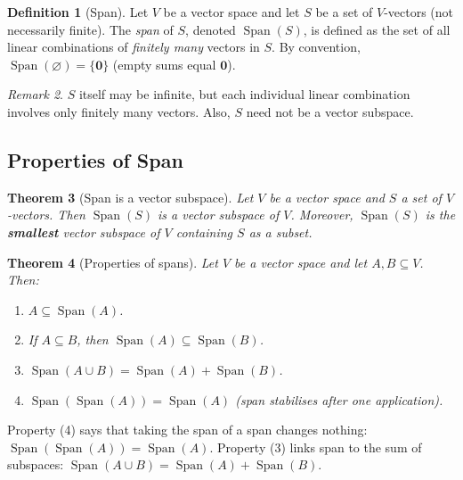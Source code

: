 \documentclass[11pt, a4paper, notitlepage]{report}
\newtheorem{theorem}{Theorem}[section]
\theoremstyle{definition}
\newtheorem{definition}[theorem]{Definition}
\theoremstyle{remark}
\newtheorem{remark}[theorem]{Remark}
\begin{document}
\begin{definition}[Span]\label{def:span}
Let $V$ be a vector space and let $S$ be a set of $V$-vectors (not necessarily finite). The \emph{span} of $S$, denoted $\operatorname{Span}(S)$, is defined as the set of all linear combinations of \emph{finitely many} vectors in $S$. By convention, $\operatorname{Span}(\varnothing) = \{\mathbf{0}\}$ (empty sums equal $\mathbf{0}$).
\end{definition}

\begin{remark}
$S$ itself may be infinite, but each individual linear combination involves only finitely many vectors. Also, $S$ need not be a vector subspace.
\end{remark}

\subsection{Properties of Span}

\begin{theorem}[Span is a vector subspace]\label{thm:span-subspace}
Let $V$ be a vector space and $S$ a set of $V$-vectors. Then $\operatorname{Span}(S)$ is a vector subspace of $V$. Moreover, $\operatorname{Span}(S)$ is the \textbf{smallest} vector subspace of $V$ containing $S$ as a subset.
\end{theorem}

\begin{theorem}[Properties of spans]\label{thm:span-properties}
Let $V$ be a vector space and let $A, B \subseteq V$. Then:
\begin{enumerate}
  \item $A \subseteq \operatorname{Span}(A)$.
  \item If $A \subseteq B$, then $\operatorname{Span}(A) \subseteq \operatorname{Span}(B)$.
  \item $\operatorname{Span}(A \cup B) = \operatorname{Span}(A) + \operatorname{Span}(B)$.
  \item $\operatorname{Span}(\operatorname{Span}(A)) = \operatorname{Span}(A)$ \quad (span \emph{stabilises} after one application).
\end{enumerate}
\end{theorem}

\begin{keyresult}[title={Key Result: Span Stabilises}]
Property (4) says that taking the span of a span changes nothing: $\operatorname{Span}(\operatorname{Span}(A)) = \operatorname{Span}(A)$. Property (3) links span to the sum of subspaces: $\operatorname{Span}(A \cup B) = \operatorname{Span}(A) + \operatorname{Span}(B)$.
\end{keyresult}
\end{document}
